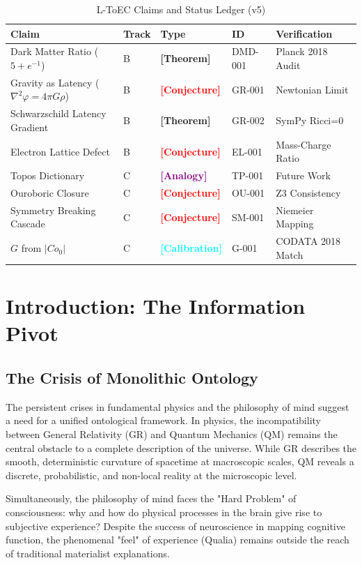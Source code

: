 \documentclass[11pt,titlepage]{article}
\newcommand{\tagtheo}{\textcolor{green!60!black}{\textbf{[Theorem]}} }
\newcommand{\tagconj}{\textcolor{red}{\textbf{[Conjecture]}} }
\newcommand{\taganal}{\textcolor{purple}{\textbf{[Analogy]}} }
\newcommand{\tagcal}{\textcolor{cyan}{\textbf{[Calibration]}} }
\begin{document}
\begin{table}[h!]
\centering
\begin{tabular}{@{}lllll@{}}
\toprule
\textbf{Claim} & \textbf{Track} & \textbf{Type} & \textbf{ID} & \textbf{Verification} \\ \midrule
Dark Matter Ratio ($5+e^{-1}$) & B & \tagtheo & DMD-001 & Planck 2018 Audit \\
Gravity as Latency ($\nabla^2 \varphi = 4\pi G \rho$) & B & \tagconj & GR-001 & Newtonian Limit \\
Schwarzschild Latency Gradient & B & \tagtheo & GR-002 & SymPy Ricci=0 \\
Electron Lattice Defect & B & \tagconj & EL-001 & Mass-Charge Ratio \\
Topos Dictionary & C & \taganal & TP-001 & Future Work \\
Ouroboric Closure & C & \tagconj & OU-001 & Z3 Consistency \\
Symmetry Breaking Cascade & C & \tagconj & SM-001 & Niemeier Mapping \\
$G$ from $|Co_0|$ & C & \tagcal & G-001 & CODATA 2018 Match \\ \bottomrule
\end{tabular}
\caption{L-ToEC Claims and Status Ledger (v5)}
\end{table}


\section{Introduction: The Information Pivot}

\subsection{The Crisis of Monolithic Ontology}
The persistent crises in fundamental physics and the philosophy of mind suggest a need for a unified ontological framework. In physics, the incompatibility between General Relativity (GR) and Quantum Mechanics (QM) remains the central obstacle to a complete description of the universe. While GR describes the smooth, deterministic curvature of spacetime at macroscopic scales, QM reveals a discrete, probabilistic, and non-local reality at the microscopic level.

Simultaneously, the philosophy of mind faces the "Hard Problem" of consciousness: why and how do physical processes in the brain give rise to subjective experience? Despite the success of neuroscience in mapping cognitive function, the phenomenal "feel" of experience (Qualia) remains outside the reach of traditional materialist explanations.
\end{document}
